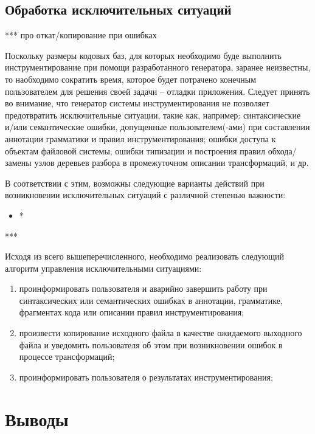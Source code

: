 \subsection{Обработка исключительных ситуаций}

***
про откат/копирование при ошибках

Поскольку размеры кодовых баз, для которых необходимо буде выполнить инструментирование при помощи разработанного генератора, заранее неизвестны, то наобходимо сократить время, которое будет потрачено конечным пользователем для решения своей задачи -- отладки приложения.
Следует принять во внимание, что генератор системы инструментирования не позволяет предотвратить исключительные ситуации, такие как, например: синтаксические и/или семантические ошибки, допущенные пользователем(-ами) при составлении аннотации грамматики и правил инструментирования; ошибки доступа к объектам файловой системы; ошибки типизации и построения правил обхода/замены узлов деревьев разбора в промежуточном описании трансформаций, и др.

В соответствии с этим, возможны следующие варианты действий при возникновении исключительных ситуаций с различной степенью важности:

\begin{itemize}[noitemsep]
  \item *
\end{itemize}

***

Исходя из всего вышеперечисленного, необходимо реализовать следующий алгоритм управления исключительными ситуациями:
\begin{enumerate}[noitemsep]
  \item проинформировать пользователя и аварийно завершить работу при синтаксических или семантических ошибках в аннотации, грамматике, фрагментах кода или описании правил инструментирования;
  \item произвести копирование исходного файла в качестве ожидаемого выходного файла и уведомить пользователя об этом при возникновении ошибок в процессе трансформаций;
  \item проинформировать пользователя о результатах инструментирования;
\end{enumerate}

\section{Выводы}

